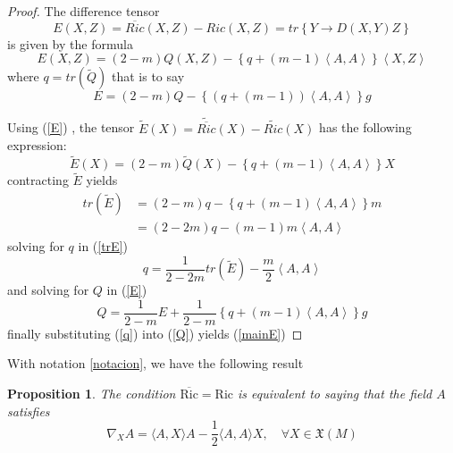 \documentclass{amsart}%
\theoremstyle{plain}
\newtheorem{proposition}{Proposition}
\numberwithin{equation}{section}
\begin{document}
\begin{proof}
The difference tensor
\[
E\left(  X,Z\right)  =\overline{Ric}\left(  X,Z\right)  -Ric\left(
X,Z\right)  =tr\left\{  Y\rightarrow D\left(  X,Y\right)  Z\right\}
\]
is given by the formula%
\[
E\left(  X,Z\right)  =\left(  2-m\right)  Q\left(  X,Z\right)  -\left\{
q+\left(  m-1\right)  \left\langle A,A\right\rangle \right\}  \left\langle
X,Z\right\rangle
\]
where $q=tr\left(  \widetilde{Q}\right)  $ that is to say%
\begin{equation}
E=\left(  2-m\right)  Q-\left\{  \left(  q+\left(  m-1\right)  \right)
\left\langle A,A\right\rangle \right\}  g \label{E}%
\end{equation}


Using (\ref{E}) , the tensor $\widetilde{E}\left(  X\right)  =\widetilde
{\overline{Ric}}\left(  X\right)  -\widetilde{Ric}\left(  X\right)  $ has the
following expression:%
\[
\widetilde{E}\left(  X\right)  =\left(  2-m\right)  \widetilde{Q}\left(
X\right)  -\left\{  q+\left(  m-1\right)  \left\langle A,A\right\rangle
\right\}  X
\]
contracting $\widetilde{E}$ yields
\begin{align}
tr\left(  \widetilde{E}\right)   &  =\left(  2-m\right)  q-\left\{  q+\left(
m-1\right)  \left\langle A,A\right\rangle \right\}  m\label{trE}\\
&  =\left(  2-2m\right)  q-\left(  m-1\right)  m\left\langle A,A\right\rangle
\nonumber
\end{align}
solving for $q$ in (\ref{trE})%
\begin{equation}
q=\frac{1}{2-2m}tr\left(  \widetilde{E}\right)  -\frac{m}{2}\left\langle
A,A\right\rangle \label{q}%
\end{equation}
and solving for $Q$ in (\ref{E})
\begin{equation}
Q=\frac{1}{2-m}E+\frac{1}{2-m}\left\{  q+\left(  m-1\right)  \left\langle
A,A\right\rangle \right\}  g \label{Q}%
\end{equation}
finally substituting (\ref{q}) into (\ref{Q}) yields (\ref{mainE})
\end{proof}

With notation \ref{notacion}, we have the following result

\begin{proposition}
\label{0.5.3} The condition $\overline{\mathrm{Ric}}=\mathrm{Ric}$ is
equivalent to saying that the field $A$ satisfies%
\begin{equation}
\nabla_{X}A=\langle A,X\rangle A-\frac{1}{2}\langle A,A\rangle X,\quad\forall
X\in\mathfrak{X}(M)\label{ATP}%
\end{equation}

\end{proposition}
\end{document}
